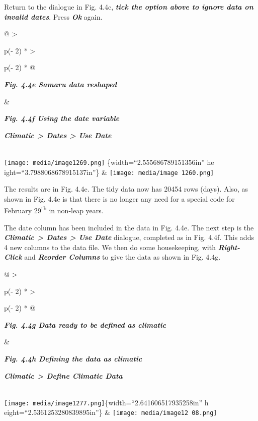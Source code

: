 \documentclass[
  letterpaper,
  DIV=11,
  numbers=noendperiod]{scrreprt}
\begin{document}
Return to the dialogue in Fig. 4.4c, \textbf{\emph{tick the option above
to ignore data on invalid dates}}. Press \textbf{\emph{Ok}} again.

\begin{longtable}[]{@{}
  >{\raggedright\arraybackslash}p{(\columnwidth - 2\tabcolsep) * }
  >{\raggedright\arraybackslash}p{(\columnwidth - 2\tabcolsep) * }@{}}
\toprule\noalign{}
\begin{minipage}[b]{\linewidth}\raggedright
\textbf{\emph{Fig. 4.4e Samaru data reshaped}}
\end{minipage} & \begin{minipage}[b]{\linewidth}\raggedright
\textbf{\emph{Fig. 4.4f Using the date variable}}

\textbf{\emph{Climatic \textgreater{} Dates \textgreater{} Use Date}}
\end{minipage} \\
\midrule\noalign{}
\endhead
\bottomrule\noalign{}
\endlastfoot
\texttt{[image: media/image1269.png]} \{width=``2.555686789151356in'' he
ight=``3.7988068678915137in''\} &
\texttt{[image: media/image 1260.png]} \\
\end{longtable}

The results are in Fig. 4.4e. The tidy data now has 20454 rows (days).
Also, as shown in Fig. 4.4e is that there is no longer any need for a
special code for February 29\textsuperscript{th} in non-leap years.

The date column has been included in the data in Fig. 4.4e. The next
step is the \textbf{\emph{Climatic \textgreater{} Dates \textgreater{}
Use Date}} dialogue, completed as in Fig. 4.4f. This adds 4 new columns
to the data file. We then do some housekeeping, with
\textbf{\emph{Right-Click}} and \textbf{\emph{Reorder Columns}} to give
the data as shown in Fig. 4.4g.

\begin{longtable}[]{@{}
  >{\raggedright\arraybackslash}p{(\columnwidth - 2\tabcolsep) * }
  >{\raggedright\arraybackslash}p{(\columnwidth - 2\tabcolsep) * }@{}}
\toprule\noalign{}
\begin{minipage}[b]{\linewidth}\raggedright
\textbf{\emph{Fig. 4.4g Data ready to be defined as climatic}}
\end{minipage} & \begin{minipage}[b]{\linewidth}\raggedright
\textbf{\emph{Fig. 4.4h Defining the data as climatic}}

\textbf{\emph{Climatic \textgreater{} Define Climatic Data}}
\end{minipage} \\
\midrule\noalign{}
\endhead
\bottomrule\noalign{}
\endlastfoot
\texttt{[image: media/image1277.png]}\{width=``2.641606517935258in'' h
eight=``2.5361253280839895in''\} &
\texttt{[image: media/image12 08.png]} \\
\end{longtable}
\end{document}

